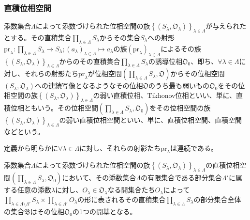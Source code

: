\documentclass[dvipdfmx]{jsarticle}
\begin{document}
\subsubsection{直積位相空間}%
\begin{dfn}
添数集合$\varLambda$によって添数づけられた位相空間の族$\left\{ \left( S_{\lambda},\mathfrak{O}_{\lambda} \right) \right\}_{\lambda \in \varLambda}$が与えられたとする。その直積集合$\prod_{\lambda \in \varLambda} S_{\lambda}$からその集合$S_{\lambda}$への射影${\mathrm{pr}}_{\lambda}:\prod_{\lambda \in \varLambda} S_{\lambda} \rightarrow S_{\lambda};\left( a_{\lambda} \right)_{\lambda \in \varLambda} \mapsto a_{\lambda}$の族$\left( {\mathrm{pr}}_{\lambda} \right)_{\lambda \in \varLambda}$によるその族$\left\{ \left( S_{\lambda},\mathfrak{O}_{\lambda} \right) \right\}_{\lambda \in \varLambda}$からのその直積集合$\prod_{\lambda \in \varLambda} S_{\lambda}$の誘導位相$\mathfrak{O}_{0}$、即ち、$\forall\lambda \in \varLambda$に対し、それらの射影たち${\mathrm{pr}}_{\lambda}$が位相空間$\left( \prod_{\lambda \in \varLambda} S_{\lambda},\mathfrak{O} \right)$からその位相空間$\left( S_{\lambda},\mathfrak{O}_{\lambda} \right)$への連続写像となるようなその位相$\mathfrak{O}$のうち最も弱いもの$\mathfrak{O}_{0}$をその位相空間の族$\left\{ \left( S_{\lambda},\mathfrak{O}_{\lambda} \right) \right\}_{\lambda \in \varLambda}$の弱い直積位相、Tikhonov位相といい、単に、直積位相ともいう。その位相空間$\left( \prod_{\lambda \in \varLambda} S_{\lambda},\mathfrak{O}_{0} \right)$をその位相空間の族$\left\{ \left( S_{\lambda},\mathfrak{O}_{\lambda} \right) \right\}_{\lambda \in \varLambda}$の弱い直積位相空間といい、単に、直積位相空間、直積空間などという。
\end{dfn}\par
定義から明らかに$\forall\lambda \in \varLambda$に対し、それらの射影たち${\mathrm{pr}}_{\lambda}$は連続である。
\begin{thm}\label{8.1.4.16}
添数集合$\varLambda$によって添数づけられた位相空間の族$\left\{ \left( S_{\lambda},\mathfrak{O}_{\lambda} \right) \right\}_{\lambda \in \varLambda}$の直積位相空間$\left( \prod_{\lambda \in \varLambda} S_{\lambda},\mathfrak{O}_{0} \right)$において、その添数集合$\varLambda$の有限集合である部分集合$\varLambda'$に属する任意の添数$\lambda$に対し、$O_{\lambda} \in \mathfrak{O}_{\lambda}$なる開集合たち$O_{\lambda}$によって$\prod_{\lambda \in \varLambda \setminus \varLambda'} S_{\lambda} \times \prod_{\lambda \in \varLambda'} O_{\lambda}$の形に表されるその直積集合$\prod_{\lambda \in \varLambda} S_{\lambda}$の部分集合全体の集合$\mathfrak{B}$はその位相$\mathfrak{O}_{0}$の1つの開基となる。
\end{thm}\par
\end{document}
